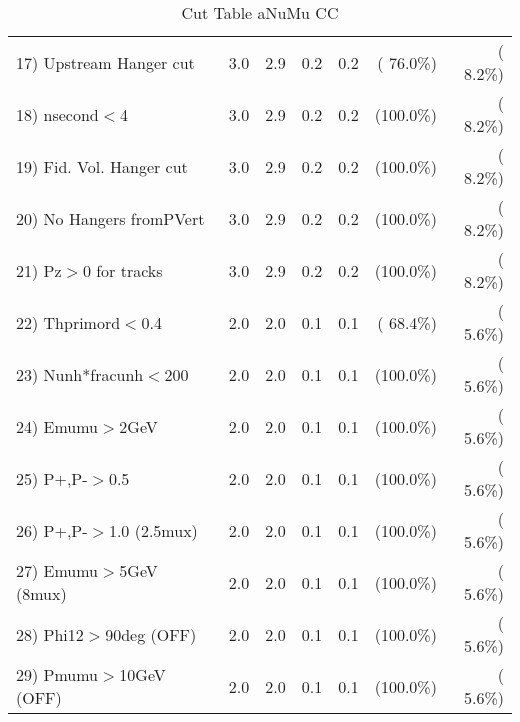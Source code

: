 \begin{table}[h!]
\begin{tabular}{||l||r|r|r|r|r|r||}
 17) Upstream Hanger cut  &          3.0 &          2.9 &          0.2 &          0.2 & ( 76.0\%) & (  8.2\%) \\
 18) nsecond$<$4          &          3.0 &          2.9 &          0.2 &          0.2 & (100.0\%) & (  8.2\%) \\
 19) Fid. Vol. Hanger cut &          3.0 &          2.9 &          0.2 &          0.2 & (100.0\%) & (  8.2\%) \\
 20) No Hangers fromPVert &          3.0 &          2.9 &          0.2 &          0.2 & (100.0\%) & (  8.2\%) \\
 21) Pz$>$0 for tracks    &          3.0 &          2.9 &          0.2 &          0.2 & (100.0\%) & (  8.2\%) \\
 22) Thprimord$<$0.4      &          2.0 &          2.0 &          0.1 &          0.1 & ( 68.4\%) & (  5.6\%) \\
 23) Nunh*fracunh$<$200   &          2.0 &          2.0 &          0.1 &          0.1 & (100.0\%) & (  5.6\%) \\
 24) Emumu$>$2GeV         &          2.0 &          2.0 &          0.1 &          0.1 & (100.0\%) & (  5.6\%) \\
 25) P+,P-$>$0.5          &          2.0 &          2.0 &          0.1 &          0.1 & (100.0\%) & (  5.6\%) \\
 26) P+,P-$>$1.0 (2.5mux) &          2.0 &          2.0 &          0.1 &          0.1 & (100.0\%) & (  5.6\%) \\
 27) Emumu$>$5GeV  (8mux) &          2.0 &          2.0 &          0.1 &          0.1 & (100.0\%) & (  5.6\%) \\
 28) Phi12$>$90deg  (OFF) &          2.0 &          2.0 &          0.1 &          0.1 & (100.0\%) & (  5.6\%) \\
 29) Pmumu$>$10GeV  (OFF) &          2.0 &          2.0 &          0.1 &          0.1 & (100.0\%) & (  5.6\%) \\
 \hline
 \hline
 \end{tabular}
 \caption{Cut Table  aNuMu CC }
 \label{tab-cutcohjpsi-mumu_res}
 \end{table}

